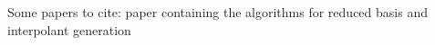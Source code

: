 Some papers to cite: paper containing the algorithms for reduced basis and interpolant generation \citep{Field_2014}